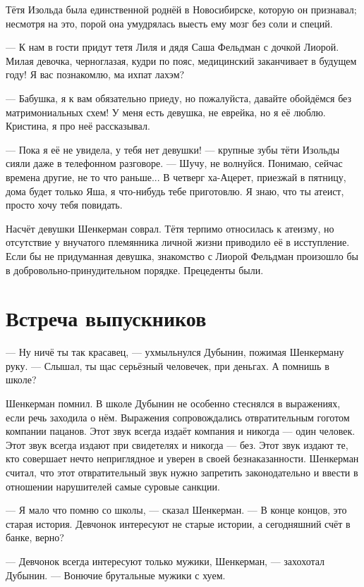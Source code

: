 \documentclass[a4paper,10pt,fleqn]{book}\usepackage{polyglossia}\setdefaultlanguage{english}\setotherlanguage{russian}\defaultfontfeatures{Ligatures=TeX,Mapping=tex-text} \usepackage{xcolor}\definecolor{lightgray}{HTML}{bbbbbb}\color{lightgray}\newcommand{\ml}[3]{\textcolor{black}{#3}}
\begin{document}
Тётя Изольда была единственной роднёй в Новосибирске, которую он признавал;
несмотря на это, порой она умудрялась выесть ему мозг без соли и специй.

--- К нам в гости придут тетя Лиля и дядя Саша Фельдман с дочкой Лиорой.
Милая девочка, черноглазая, кудри по пояс, медицинский заканчивает в будущем году!
Я вас познакомлю, ма ихпат лахэм?

--- Бабушка, я к вам обязательно приеду, но пожалуйста, давайте обойдёмся без матримониальных схем!
У меня есть девушка, не еврейка, но я её люблю.
Кристина, я про неё рассказывал.

--- Пока я её не увидела, у тебя нет девушки! --- крупные зубы тёти Изольды сияли даже в телефонном разговоре.
--- Шучу, не волнуйся.
Понимаю, сейчас времена другие, не то что раньше...
В четверг ха-Ацерет, приезжай в пятницу, дома будет только Яша, я что-нибудь тебе приготовлю.
Я знаю, что ты атеист, просто хочу тебя повидать.

Насчёт девушки Шенкерман соврал.
Тётя терпимо относилась к атеизму, но отсутствие у внучатого племянника личной жизни приводило её в исступление.
Если бы не придуманная девушка, знакомство с Лиорой Фельдман произошло бы в добровольно-принудительном порядке.
Прецеденты были.

\section{Встреча выпускников}

--- Ну ничё ты так красавец, --- ухмыльнулся Дубынин, пожимая Шенкерману руку.
--- Слышал, ты щас серьёзный человечек, при деньгах.
А помнишь в школе?

Шенкерман помнил.
В школе Дубынин не особенно стеснялся в выражениях, если речь заходила о нём.
Выражения сопровождались отвратительным гоготом компании пацанов.
Этот звук всегда издаёт компания и никогда --- один человек.
Этот звук всегда издают при свидетелях и никогда --- без.
Этот звук издают те, кто совершает нечто неприглядное и уверен в своей безнаказанности.
Шенкерман считал, что этот отвратительный звук нужно запретить законодательно и ввести в отношении нарушителей самые суровые санкции.

--- Я мало что помню со школы, --- сказал Шенкерман.
--- В конце концов, это старая история.
Девчонок интересуют не старые истории, а сегодняшний счёт в банке, верно?

--- Девчонок всегда интересуют только мужики, Шенкерман, --- захохотал Дубынин.
--- Вонючие брутальные мужики с хуем.
\end{document}
